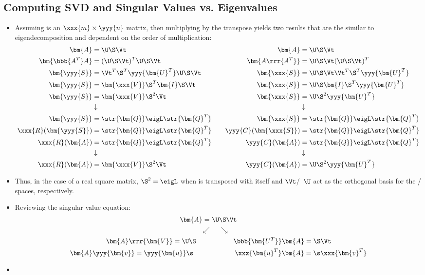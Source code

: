 \begin{itemize}
  \newpage
  \subsection{Computing SVD and Singular Values vs. Eigenvalues}\label{Computing SVD and Singular Values vs. Eigenvalues}
  \begin{itemize}
    \item Assuming  is an \(\xxx{m} \times \yyy{n} \) matrix, then multiplying by the transpose yields two results that are the similar to eigendecomposition and dependent on the order of multiplication:
    \begin{align*}
      \bm{A} &= \U \S \Vt &&& \bm{A} &= \U \S \Vt \\
      \bm{\bbb{A^T}A} &= (\U\S\Vt)^T \U\S\Vt &&& \bm{A\rrr{A^T}} &=  \U\S\Vt (\U\S\Vt)^T \\
      \bm{\yyy{S}} &= \Vt^T\S^T\yyy{\bm{U}^T} \U\S\Vt &&& \bm{\xxx{S}} &=  \U\S\Vt \Vt^T\S^T\yyy{\bm{U}^T} \\
      \bm{\yyy{S}} &= \bm{\xxx{V}}\S^T\bm{I}\S\Vt &&& \bm{\xxx{S}} &=  \U\S\bm{I}\S^T\yyy{\bm{U}^T} \\
      \bm{\yyy{S}} &= \bm{\xxx{V}}\S^2\Vt &&& \bm{\xxx{S}} &=  \U\S^2\yyy{\bm{U}^T} \\
      &\downarrow &&& &\downarrow \\
      \bm{\yyy{S}} &= \str{\bm{Q}}\eigL \str{\bm{Q}^T} &&& \bm{\xxx{S}} &= \str{\bm{Q}}\eigL \str{\bm{Q}^T} \\
      \xxx{R}(\bm{\yyy{S}}) &= \str{\bm{Q}}\eigL \str{\bm{Q}^T} &&& \yyy{C}(\bm{\xxx{S}}) &= \str{\bm{Q}}\eigL \str{\bm{Q}^T} \\
      \xxx{R}(\bm{A}) &= \str{\bm{Q}}\eigL \str{\bm{Q}^T} &&& \yyy{C}(\bm{A}) &= \str{\bm{Q}}\eigL \str{\bm{Q}^T} \\
      &\downarrow &&& &\downarrow \\ 
      \xxx{R}(\bm{A}) &= \bm{\xxx{V}}\S^2\Vt &&& \yyy{C}(\bm{A}) &=  \U\S^2\yyy{\bm{U}^T} 
    \end{align*}
    \item Thus, in the case of a real square matrix, \(\S^2 = \eigL\) when  is transposed with itself and \(\Vt\)/~\(\U\) act as the orthogonal basis for the / spaces, respectively.
    \item Reviewing the singular value equation:
    \begin{align*}
      \bm{A} = &~\U \S \Vt \\ 
      \swarrow &\hspace{14pt} \searrow \\
      \bm{A}\rrr{\bm{V}} = \U \S \hspace{20pt}&\hspace{35pt} \bbb{\bm{U^T}}\bm{A} = \S \Vt \\
      \bm{A}\yyy{\bm{v}}= \yyy{\bm{u}} \s \hspace{24pt}&\hspace{37pt} \xxx{\bm{u}^T}\bm{A}=\s \xxx{\bm{v}^T} 
    \end{align*}
    \item 
  \end{itemize}


\end{itemize}
